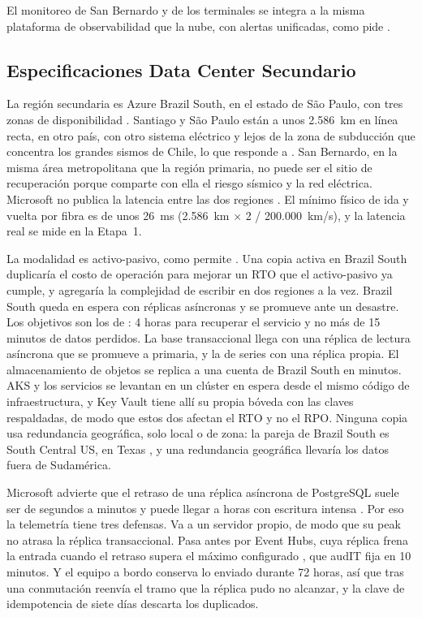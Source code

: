 El monitoreo de San Bernardo y de los terminales se integra a la misma plataforma de observabilidad que
la nube, con alertas unificadas, como pide .

\subsection{Especificaciones Data Center Secundario}\label{sec:4-dc-secundario}

La región secundaria es Azure Brazil South, en el estado de São Paulo, con tres zonas de
disponibilidad \parencite{ms_regions}. Santiago y São Paulo están a unos 2.586~km en línea recta, en
otro país, con otro sistema eléctrico y lejos de la zona de subducción que concentra los grandes
sismos de Chile, lo que responde a . San Bernardo, en la misma área metropolitana
que la región primaria, no puede ser el sitio de recuperación porque comparte con ella el riesgo
sísmico y la red eléctrica. Microsoft no publica la latencia entre las dos regiones
\parencite{ms_latencia}. El mínimo físico de ida y vuelta por fibra es de unos 26~ms (2.586~km × 2 /
200.000~km/s), y la latencia real se mide en la Etapa~1.

La modalidad es activo-pasivo, como permite . Una copia activa en Brazil South
duplicaría el costo de operación para mejorar un RTO que el activo-pasivo ya cumple, y agregaría la
complejidad de escribir en dos regiones a la vez. Brazil South queda en espera con réplicas asíncronas y
se promueve ante un desastre. Los objetivos son los de : 4 horas para recuperar el
servicio y no más de 15 minutos de datos perdidos. La base transaccional llega con una réplica de lectura asíncrona que se
promueve a primaria, y la de series con una réplica propia. El almacenamiento de objetos se replica a
una cuenta de Brazil South en minutos. AKS y los servicios se levantan en un clúster en espera desde el
mismo código de infraestructura, y Key Vault tiene allí su propia bóveda con las claves respaldadas, de
modo que estos dos afectan el RTO y no el RPO. Ninguna copia usa redundancia geográfica, solo local o de
zona: la pareja de Brazil South es South Central US, en Texas \parencite{ms_regions}, y una redundancia
geográfica llevaría los datos fuera de Sudamérica.

Microsoft advierte que el retraso de una réplica asíncrona de PostgreSQL suele ser de segundos a minutos
y puede llegar a horas con escritura intensa \parencite{ms_pg_replicas}. Por eso la telemetría tiene tres
defensas. Va a un servidor propio, de modo que su peak no atrasa la réplica transaccional. Pasa antes por
Event Hubs, cuya réplica frena la entrada cuando el retraso supera el máximo configurado
\parencite{ms_eh_georep}, que audIT fija en 10 minutos. Y el equipo a bordo conserva lo enviado durante
72 horas, así que tras una conmutación reenvía el tramo que la réplica pudo no alcanzar, y la clave de
idempotencia de siete días descarta los duplicados.

